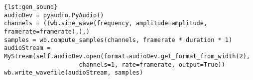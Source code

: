 \enlargethispage{\baselineskip}
\enlargethispage{\baselineskip}
\enlargethispage{\baselineskip}
\begin{lstlisting}[caption={Erzeugung eines Soundsignals},label={lst:gen_sound}]{lst:gen_sound} 
audioDev = pyaudio.PyAudio()
channels = ((wb.sine_wave(frequency, amplitude=amplitude, framerate=framerate),),)
samples = wb.compute_samples(channels, framerate * duration * 1)
audioStream = MyStream(self.audioDev.open(format=audioDev.get_format_from_width(2),
					 channels=1, rate=framerate, output=True))
wb.write_wavefile(audioStream, samples)
\end{lstlisting}


\nocite{Gupta2012}
